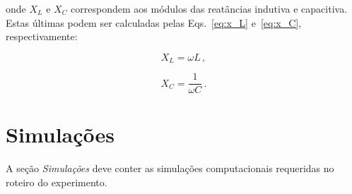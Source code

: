 \documentclass[10pt,twocolumn,letterpaper]{article}
\begin{document}
\noindent
onde $X_L$ e $X_C$ correspondem aos módulos das reatâncias indutiva e capacitiva. Estas últimas podem ser calculadas pelas Eqs.~\eqref{eq:x_L} e~\eqref{eq:x_C}, respectivamente:

\begin{equation} \label{eq:x_L}
X_L = \omega L \, ,
\end{equation}

\begin{equation} \label{eq:x_C}
X_C = \frac{1}{\omega C} \, .
\end{equation} 



\section{Simulações}

A seção {\em Simulações} deve conter as simulações computacionais requeridas no roteiro do experimento. 



{\small


}
\end{document}
